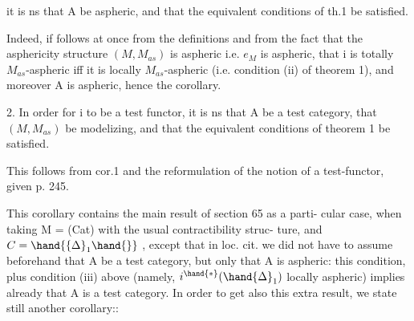 
it is ns that A be aspheric,  and that the equivalent conditions of th.1
be satisfied.

Indeed,  if follows at once from the definitions  and from the
fact that the asphericity structure $(M,M_{as})$ is aspheric i.e.  $e_M$ is 
aspheric,  that  i is totally $M_{as}$-aspheric iff it is locally $M_{as}$-aspheric
(i.e. condition (ii) of theorem 1),  and  moreover A is aspheric,  hence
the corollary.

\hand{\uline{\textcolor{black}{Corollary}}} 2.  In order for i to be a test functor,  it is ns that A be
a test category,  that $(M,M_{as})$  be modelizing,  and that the equivalent
conditions of theorem 1 be satisfied.

This follows from cor.1  and the reformulation of the notion of a
test-functor,  given  p. 245.

This corollary contains  the main result of section 65 as a parti-%
cular case,  when taking M = (Cat)  with the usual contractibility struc-%
ture,   and $C = \hand{\{\Delta}_1\hand{\}}$ ,  except that in loc. cit.  we did not
have to assume beforehand that A be a test category,  but only that A is
aspheric:  this condition,  plus condition (iii) above (namely,  $i^{\hand{*}}(\hand{\Delta}_1)$
locally aspheric)  implies already that A is a test category.  In order
to get also this extra result,  we state still another corollary:\hand{(*)}:

